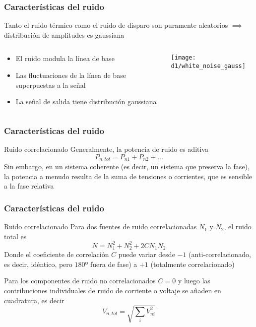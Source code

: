 \documentclass{beamer}
\begin{document}
\begin{frame}
\frametitle{Caracter\'isticas del ruido}
\begin{block}{}
Tanto el ruido t\'ermico como el ruido de disparo son puramente aleatorios $\implies$ 
distribuci\'on de amplitudes es gaussiana
\end{block}
\begin{columns}
\begin{column}{0.5\textwidth}
\begin{block}{}
\begin{itemize}
\item El ruido modula la l\'inea de base
\item Las fluctuaciones de la l\'inea de base superpuestas a la señal
\item La señal de salida tiene distribuci\'on gaussiana
\end{itemize}
\end{block}
\end{column}
\begin{column}{0.5\textwidth}
\texttt{[image: d1/white\_noise\_gauss]}
\end{column}
\end{columns}
\end{frame} 

\begin{frame}
\frametitle{Caracter\'isticas del ruido}
\begin{block}{Ruido correlacionado}
Generalmente, la potencia de ruido es aditiva
$$P_{n,tot} = P_{n1} + P_{n2} + \ldots$$
Sin embargo, en un sistema coherente (es decir, un sistema que preserva la fase), 
la potencia a menudo resulta de la suma de tensiones o corrientes, que es 
sensible a la fase relativa
\end{block}
\end{frame} 

\begin{frame}
\frametitle{Caracter\'isticas del ruido}
\begin{block}{Ruido correlacionado}
Para dos fuentes de ruido correlacionadas $N_1$ y $N_2$, el ruido total es
$$N = N_1^2 + N_2^2 + 2CN_1N_2$$
Donde el coeficiente de correlaci\'on $C$ puede variar desde \alert{$-1$} (anti-correlacionado, 
es decir, id\'entico, pero $180º$ fuera de fase) a \alert{$+1$} (totalmente correlacionado)

\vspace{2mm}
Para los componentes de ruido no correlacionados $C = 0$ y luego las contribuciones 
individuales de ruido de corriente o voltaje se añaden en cuadratura, es decir
$$V_{n,tot} = \sqrt{\sum_i V_{ni}^2}$$
\end{block}
\end{frame} 
\end{document}
